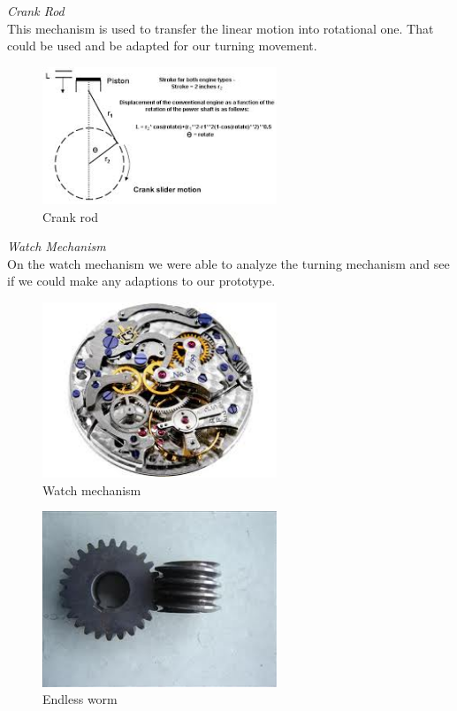\noindent\emph{Crank Rod}\\
 This mechanism is used to transfer the linear motion into rotational one. That could be used and be adapted for our turning movement.\\

\begin{figure}[h]
\centering
\includegraphics[width=7cm]{brazil_images/image019.jpg}
\caption{Crank rod} %
\label{fig:crank_rod}
\end{figure}


\noindent\emph{Watch Mechanism}\\
 On the watch mechanism we were able to analyze the turning mechanism and see if we could make any adaptions to our prototype.\\

\begin{figure}[h]
\centering
\includegraphics[width=7cm]{brazil_images/image020.jpg}
\caption{Watch mechanism}%
\label{fig:watch_mechanism}
\end{figure}


\begin{figure}[h]
\centering
\includegraphics[width=7cm]{brazil_images/image021.jpg}
\caption{Endless worm} %
\label{fig:endless_worm}
\end{figure}


